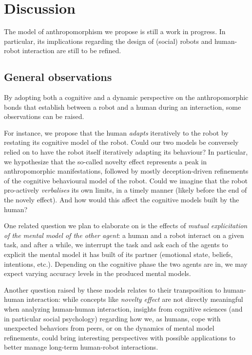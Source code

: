 \documentclass{frontiersSCNS} %
\begin{document}
%
%
%
%
%
%


\section{Discussion}
\label{sec:discussion}

The model of anthropomorphism we propose is still a work in progress. In
particular, its implications regarding the design of (social) robots and
human-robot interaction are still to be refined.

\subsection{General observations}

By adopting both a cognitive and a dynamic perspective on the anthropomorphic
bonds that establish between a robot and a human during an interaction, some
observations can be raised.

For instance, we propose that the human \emph{adapts} iteratively to the robot
by restating its cognitive model of the robot. Could our two models be
conversely relied on to have the robot itself iteratively adapting its
behaviour? In particular, we hypothesize that the so-called novelty effect
represents a peak in anthropomorphic manifestations, followed by mostly
deception-driven refinements of the cognitive behavioural model of the robot.
Could we imagine that the robot pro-actively \emph{verbalises} its own limits,
in a timely manner (likely before the end of the novely effect). And how would
this affect the cognitive models built by the human?

One related question we plan to elaborate on is the effects of \emph{mutual
explicitation of the mental model of the other agent}: a human and a robot
interact on a given task, and after a while, we interrupt the task and ask each
of the agents to explicit the mental model it has built of its partner
(emotional state, beliefs, intentions, etc.). Depending on the cognitive phase
the two agents are in, we may expect varying accuracy levels in the produced
mental models.

Another question raised by these models relates to their transposition to
human-human interaction: while concepts like \emph{novelty effect} are not
directly meaningful when analyzing human-human interaction, insights from
cognitive sciences (and in particular social psychology) regarding how we, as
humans, cope with unexpected behaviors from peers, or on the dynamics of mental
model refinements, could bring interesting perspectives with possible
applications to better manage long-term human-robot interactions.
\end{document}
